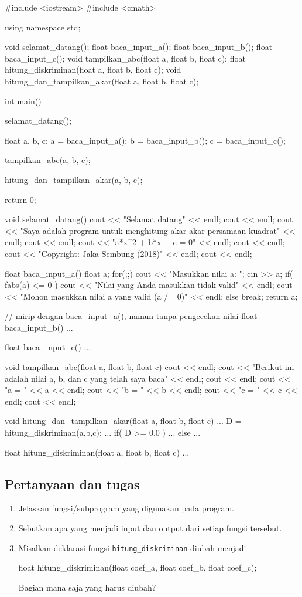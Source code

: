 \documentclass[a4paper,11pt]{extarticle}
\begin{document}
\begin{cppcode}
#include <iostream>
#include <cmath>

using namespace std;

void selamat_datang();
float baca_input_a();
float baca_input_b();
float baca_input_c();
void tampilkan_abc(float a, float b, float c);
float hitung_diskriminan(float a, float b, float c);
void hitung_dan_tampilkan_akar(float a, float b, float c);

int main()
{
  selamat_datang();

  float a, b, c;
  a = baca_input_a();
  b = baca_input_b();
  c = baca_input_c();

  tampilkan_abc(a, b, c);

  hitung_dan_tampilkan_akar(a, b, c);
  
  return 0;
}

void selamat_datang()
{
  cout << "Selamat datang" << endl;
  cout << endl;
  cout << "Saya adalah program untuk menghitung akar-akar persamaan kuadrat" << endl;
  cout << endl;
  cout << "a*x^2 + b*x + c = 0" << endl;
  cout << endl;
  cout << "Copyright: Jaka Sembung (2018)" << endl;
  cout << endl;
}

float baca_input_a()
{
  float a;
  for(;;) {
    cout << "Masukkan nilai a: ";
    cin >> a;
    if( fabs(a) <= 0 ) {
      cout << "Nilai yang Anda masukkan tidak valid" << endl;
      cout << "Mohon masukkan nilai a yang valid (a /= 0)" << endl;
    }
    else break;
  }
  return a;
}

// mirip dengan baca_input_a(), namun tanpa pengecekan nilai
float baca_input_b()
{...}

float baca_input_c()
{...}

void tampilkan_abc(float a, float b, float c)
{
  cout << endl;
  cout << "Berikut ini adalah nilai a, b, dan c yang telah saya baca" << endl;
  cout << endl;
  cout << "a = " << a << endl;
  cout << "b = " << b << endl;
  cout << "c = " << c << endl;
  cout << endl;
}

void hitung_dan_tampilkan_akar(float a, float b, float c)
{
  ...
  D = hitung_diskriminan(a,b,c);
  ...
  if( D >= 0.0 ) {
    ...
  }
  else {
    ...
  }
}

float hitung_diskriminan(float a, float b, float c)
{ ... }
\end{cppcode}


\subsection{Pertanyaan dan tugas}

\begin{enumerate}
\item Jelaskan fungsi/subprogram yang digunakan pada program.
\item Sebutkan apa yang menjadi input dan output dari setiap fungsi tersebut.
\item Misalkan deklarasi fungsi \texttt{hitung\_diskriminan} diubah menjadi
\begin{cppcode}
float hitung_diskriminan(float coef_a, float coef_b, float coef_c);
\end{cppcode}
Bagian mana saja yang harus diubah?
\end{enumerate}
\end{document}
